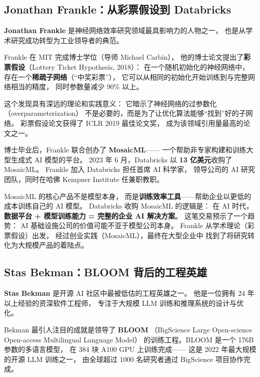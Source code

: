 \subsection{Jonathan Frankle：从彩票假设到 Databricks}

\textbf{Jonathan Frankle} 是神经网络效率研究领域最具影响力的人物之一，
也是从学术研究成功转型为工业领导者的典范。

Frankle 在 MIT 完成博士学位（导师 Michael Carbin），
他的博士论文提出了\textbf{彩票假设}（Lottery Ticket Hypothesis, 2018）：
在一个随机初始化的神经网络中，
存在一个\textbf{稀疏子网络}（``中奖彩票''），
它可以从相同的初始化开始训练到与完整网络相当的精度，
同时参数量减少 90\% 以上。

这个发现具有深远的理论和实践意义：
它暗示了神经网络的过参数化（overparameterization）
不是必要的，而是为了让优化算法能够``找到''好的子网络。
彩票假设论文获得了 ICLR 2019 最佳论文奖，
成为该领域引用量最高的论文之一。

博士毕业后，Frankle 联合创办了 \textbf{MosaicML}——
一个帮助非专家构建和训练大型生成式 AI 模型的平台。
2023 年 6 月，Databricks 以 \textbf{13 亿美元}收购了 MosaicML。
Frankle 加入 Databricks 担任首席 AI 科学家，
领导公司的 AI 研究团队，同时在哈佛 Kempner Institute 任兼职教职。

\begin{whybox}
MosaicML 的核心产品不是模型本身，
而是\textbf{训练效率工具}——帮助企业以更低的成本训练自己的 AI 模型。
Databricks 收购 MosaicML 的逻辑是：
在 AI 时代，\textbf{数据平台 + 模型训练能力 = 完整的企业 AI 解决方案}。
这笔交易预示了一个趋势：
AI 基础设施公司的价值可能不亚于模型公司本身。
Frankle 从学术理论（彩票假设）出发，
经过创业实践（MosaicML），最终在大型企业中
找到了将研究转化为大规模产品的着陆点。
\end{whybox}

\subsection{Stas Bekman：BLOOM 背后的工程英雄}

\textbf{Stas Bekman} 是开源 AI 社区中最被低估的工程英雄之一。
他是一位拥有 24 年以上经验的资深软件工程师，
专注于大规模 LLM 训练和推理系统的设计与优化。

Bekman 最引人注目的成就是领导了 \textbf{BLOOM}
（BigScience Large Open-science Open-access Multilingual Language Model）
的训练工程。BLOOM 是一个 176B 参数的多语言模型，
在 384 块 A100 GPU 上训练完成——
这是 2022 年最大规模的开源 LLM 训练之一，
由全球超过 1000 名研究者通过 BigScience 项目协作完成。

